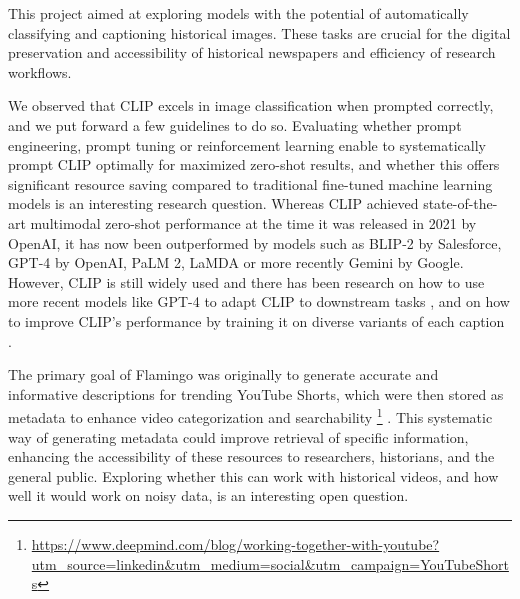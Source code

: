 
This project aimed at exploring models with the potential of automatically classifying and captioning historical images. These tasks are crucial for the digital preservation and accessibility of historical newspapers and efficiency of research workflows. 

We observed that CLIP excels in image classification when prompted correctly, and we put forward a few guidelines to do so. Evaluating whether prompt engineering, prompt tuning or reinforcement learning \parencite{deng2022rlprompt} enable to systematically prompt CLIP optimally for maximized zero-shot results, and whether this offers significant resource saving compared to traditional fine-tuned machine learning models is an interesting research question. Whereas CLIP achieved state-of-the-art multimodal zero-shot performance at the time it was released in 2021 by OpenAI, it has now been outperformed by models such as BLIP-2 by Salesforce, GPT-4 by OpenAI, PaLM 2, LaMDA or more recently Gemini by Google. However, CLIP is still widely used and there has been research on how to use more recent models like GPT-4 to adapt CLIP to downstream tasks \parencite{maniparambil2023clip-gpt4}, and on how to improve CLIP's performance by training it on diverse variants of each caption \parencite{fan2023improving}.


The primary goal of Flamingo was originally to generate accurate and informative descriptions for trending YouTube Shorts, which were then stored as metadata to enhance video categorization and searchability \footnote{\url{https://www.deepmind.com/blog/working-together-with-youtube?utm_source=linkedin&utm_medium=social&utm_campaign=YouTubeShorts}} .  This systematic way of generating metadata could improve retrieval of specific information, enhancing the accessibility of these resources to researchers, historians, and the general public. Exploring whether this can work with historical videos, and how well it would work on noisy data, is an interesting open question.

